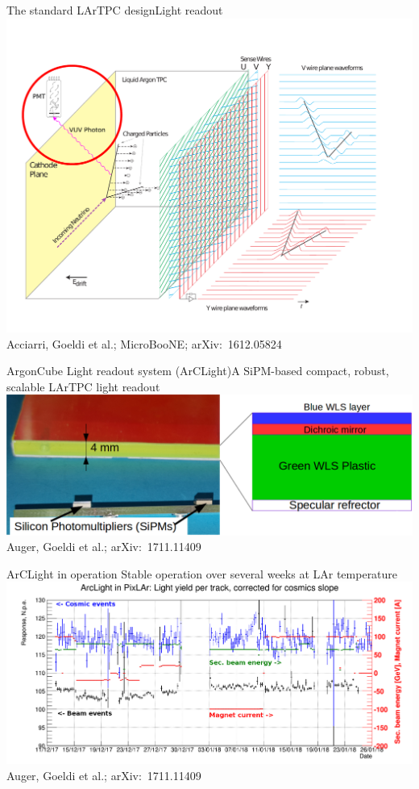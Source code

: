 \documentclass[]{beamer}
\newcommand*{\emphcol}{blue}
\newcommand*{\AC}{{ArgonCube}}
\newcommand*{\AL}{{ArCLight}}
\newcommand*{\uboone}{{MicroBooNE}}
\newcommand*{\lar}{{LAr}}
\newcommand*{\lartpc}{{LArTPC}}
\begin{document}
\begin{frame}{The standard \lartpc{} design}{Light readout}
	\centering
	\includegraphics[viewport=30 40 720 540, clip, height=.66\textheight]{defence/TPCprinciple_light-ro}\\
	{\tiny Acciarri, Goeldi et al.; \uboone{}; arXiv:~1612.05824~\cite{uboone}}
\end{frame}

\begin{frame}{\AC{} Light readout system (\AL{})}{\color{\emphcol}A SiPM-based compact, robust, scalable \lartpc{} light readout}
	\centering
	\includegraphics[width=\textwidth]{arclight/structure}\\
	{\tiny Auger, Goeldi et al.; arXiv:~1711.11409~\cite{arclight}}
\end{frame}

\begin{frame}{\AL{} in operation}{\color{\emphcol} Stable operation over several weeks at \lar{} temperature}
	\centering
	\includegraphics[viewport=0 0 1648 690, clip, width=\textwidth]{arclight/stability_cosm_beam_mod}\\
	{\tiny Auger, Goeldi et al.; arXiv:~1711.11409~\cite{arclight}}
\end{frame}
\end{document}
